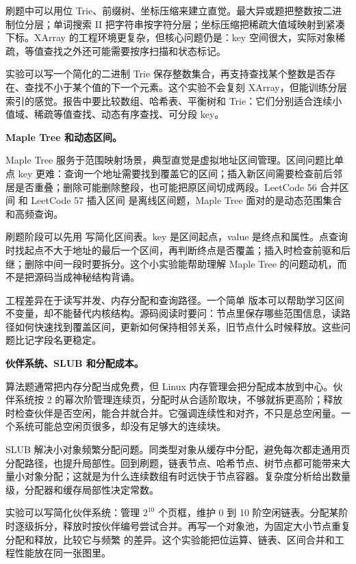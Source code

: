 刷题中可以用位 Trie、前缀树、坐标压缩来建立直觉。最大异或题把整数按二进制位分层；单词搜索 II 把字符串按字符分层；坐标压缩把稀疏大值域映射到紧凑下标。XArray 的工程环境更复杂，但核心问题仍是：key 空间很大，实际对象稀疏，等值查找之外还可能需要按序扫描和状态标记。

实验可以写一个简化的二进制 Trie 保存整数集合，再支持查找某个整数是否存在、查找不小于某个值的下一个元素。这个实验不会复刻 XArray，但能训练分层索引的感觉。报告中要比较数组、哈希表、平衡树和 Trie：它们分别适合连续小值域、稀疏等值查找、动态有序查找、可分段 key。

\noindent\textbf{Maple Tree 和动态区间。}

Maple Tree 服务于范围映射场景，典型直觉是虚拟地址区间管理。区间问题比单点 key 更难：查询一个地址需要找到覆盖它的区间；插入新区间需要检查前后邻居是否重叠；删除可能删除整段，也可能把原区间切成两段。LeetCode 56 合并区间 和 LeetCode 57 插入区间 是离线区间题，Maple Tree 面对的是动态范围集合和高频查询。

刷题阶段可以先用  写简化区间表。key 是区间起点，value 是终点和属性。点查询时找起点不大于地址的最后一个区间，再判断终点是否覆盖；插入时检查前驱和后继；删除中间一段时要拆分。这个小实验能帮助理解 Maple Tree 的问题动机，而不是把源码当成神秘结构背诵。

工程差异在于读写并发、内存分配和查询路径。一个简单  版本可以帮助学习区间不变量，却不能替代内核结构。源码阅读时要问：节点里保存哪些范围信息，读路径如何快速找到覆盖区间，更新如何保持相邻关系，旧节点什么时候释放。这些问题比记字段名更稳定。

\noindent\textbf{伙伴系统、SLUB 和分配成本。}

算法题通常把内存分配当成免费，但 Linux 内存管理会把分配成本放到中心。伙伴系统按 2 的幂次阶管理连续页，分配时从合适阶取块，不够就拆更高阶；释放时检查伙伴是否空闲，能合并就合并。它强调连续性和对齐，不只是总空闲量。一个系统可能总空闲页很多，却没有足够大的连续块。

SLUB 解决小对象频繁分配问题。同类型对象从缓存中分配，避免每次都走通用页分配路径，也提升局部性。回到刷题，链表节点、哈希节点、树节点都可能带来大量小对象分配；这就是为什么连续数组有时远快于节点容器。复杂度分析给出数量级，分配器和缓存局部性决定常数。

实验可以写简化伙伴系统：管理 \ensuremath{2^{10}} 个页框，维护 0 到 10 阶空闲链表。分配某阶时逐级拆分，释放时按伙伴编号尝试合并。再写一个对象池，为固定大小节点重复分配和释放，比较它与频繁  的差异。这个实验能把位运算、链表、区间合并和工程性能放在同一张图里。

